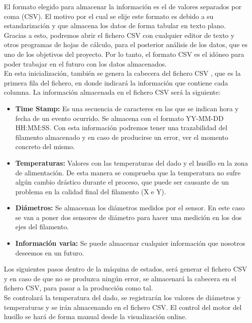 El formato elegido para almacenar la información es el de valores separados por coma (CSV). El motivo por el cual se elije este formato es debido a su estandarización y que almacena los datos de forma tabular en texto plano. Gracias a esto, podremos abrir el fichero CSV con cualquier editor de texto y otros programas de hojas de cálculo, para el posterior análisis de los datos, que es uno de los objetivos del proyecto. Por lo tanto, el formato CSV es el idóneo para poder trabajar en el futuro con los datos almacenados.\\

En esta inicialización, también se genera la cabecera del fichero CSV , que es la primera fila del fichero, en donde indicará la información que contiene cada columna. La información almacenada en el fichero CSV será la siguiente:

\begin{itemize}
	\item{\textbf{Time Stamp: }Es una secuencia de caracteres en las que se indican hora y fecha de un evento ocurrido. Se almacena con el  formato YY-MM-DD HH:MM:SS. Con esta información podremos tener una trazabilidad del filamento almacenado y en caso de producirse un error, ver el momento concreto del mismo.}
	\item{\textbf{Temperaturas: }Valores con las temperaturas del dado y el husillo en la zona de alimentación. De esta manera se comprueba que la temperatura no sufre algún cambio drástico durante el proceso, que puede ser causante de un problema en la calidad final del filamento (X e Y).}
	\item{\textbf{Diámetros: }Se almacenan los diámetros medidos por el sensor. En este caso se van a poner dos sensores de diámetro para hacer una medición en los dos ejes del filamento.}
	\item{\textbf{Información varia: }Se puede almacenar cualquier información que nosotros deseemos en un futuro.}
\end{itemize}

Los siguientes pasos dentro de la máquina de estados, será generar el fichero CSV y en caso de que no se produzca ningún error,	 se almacenará la cabecera en el fichero CSV, para pasar a la producción como tal.\\
Se controlará la temperatura del dado, se registrarán los valores de diámetros y temperaturas y se irán almacenando en el fichero CSV. El control del motor del husillo se hará de forma manual desde la visualización online.\\

